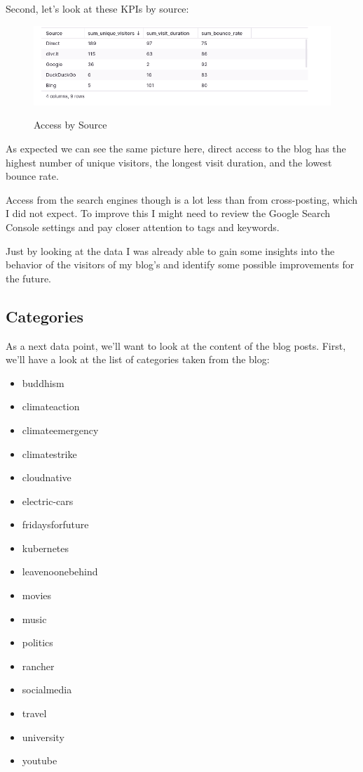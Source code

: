 Second, let's look at these KPIs by source:

\begin{figure}[H]
\centering
\caption {Access by Source}
\includegraphics[width=\linewidth]{images/access-source.png}
\label{fig:accessSource}
\end{figure}

As expected we can see the same picture here, direct access to the blog has the highest number of unique visitors, the longest visit duration, and the lowest bounce rate.

Access from the search engines though is a lot less than from cross-posting, which I did not expect. To improve this I might need to review the Google Search Console settings and pay closer attention to tags and keywords.

Just by looking at the data I was already able to gain some insights into the behavior of the visitors of my blog's and identify some possible improvements for the future.

\subsection{Categories}

As a next data point, we'll want to look at the content of the blog posts. First, we'll have a look at the list of categories taken from the blog:

\begin{itemize}
\item buddhism
\item climateaction
\item climateemergency
\item climatestrike
\item cloudnative
\item electric-cars
\item fridaysforfuture
\item kubernetes
\item leavenoonebehind
\item movies
\item music
\item politics
\item rancher
\item socialmedia
\item travel
\item university
\item youtube
\end{itemize}


